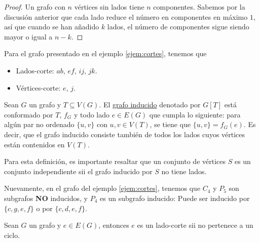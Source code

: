 \begin{proof}
    Un grafo con $n$ vértices sin lados tiene $n$ componentes. Sabemos por la discusión anterior que cada lado reduce el número en componentes en máximo $1$, así que cuando se han añadido $k$ lados, el número de componentes sigue siendo mayor o igual a $n-k$.
\end{proof}

\begin{ejem}
    Para el grafo presentado en el ejemplo \ref{ejem:cortes}, tenemos que
    
    \begin{itemize}
        \item Lados-corte: $ab$, $ef$, $ij$, $jk$.
        \item Vértices-corte: $e$, $j$.
    \end{itemize}
\end{ejem}

\begin{defn}
    Sean $G$ un grafo y $T \subseteq V(G)$. El \ul{grafo inducido} denotado por $G[T]$ está conformado por $T$, $f_G$ y todo lado $e \in E(G)$ que cumpla lo siguiente: para algún par no ordenado $\{u,v\}$ con $u,v \in V(T)$, se tiene que $\{u,v\} = f_G(e)$. Es decir, que el grafo inducido consiste también de todos los lados cuyos vértices están contenidos en $V(T)$.
\end{defn}

Para esta definición, es importante resaltar que un conjunto de vértices $S$ es un conjunto independiente sii el grafo inducido por $S$ no tiene lados.

\begin{ejem}
    Nuevamente, en el grafo del ejemplo \ref{ejem:cortes}, tenemos que $C_4$ y $P_5$ son subgrafos \textbf{NO} inducidos, y $P_4$ es un subgrafo inducido: Puede ser inducido por $\{c,g,e,f\}$ o por $\{c,d,e,f\}$.
\end{ejem}

\begin{teo}
    Sean $G$ un grafo y $e \in E(G)$, entonces $e$ es un lado-corte sii no pertenece a un ciclo.
\end{teo}

